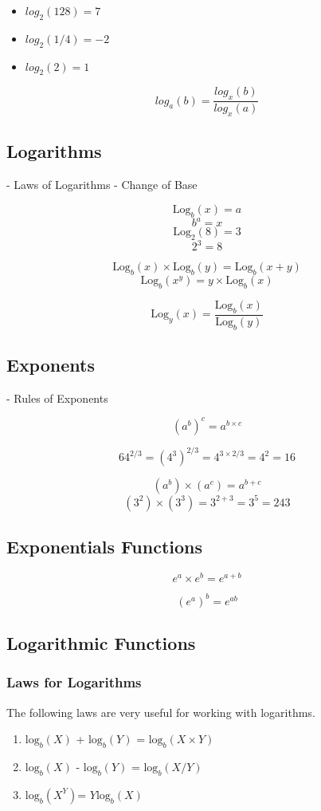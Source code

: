 \documentclass[]{report}
\begin{document}
\begin{itemize}
\item $log_2(128) = 7$
\item $log_2(1/4) = -2$
\item $log_2(2) = 1$
\end{itemize}

\[ log_a(b) = \frac{log_x(b)}{log_x(a)} \]

\subsection{Logarithms} 
- Laws of Logarithms
- Change of Base

\[ \mbox{Log}_b(x) = a \] \[b^a = x \]
\[ \mbox{Log}_2(8) = 3 \] \[2^3 = 8 \]

\[ \mbox{Log}_b(x) \times \mbox{Log}_b(y) =  \mbox{Log}_b(x+y) \]
\[ \mbox{Log}_b(x^y) =  y \times \mbox{Log}_b(x) \]

\[ \mbox{Log}_y(x)  =  \frac{ \mbox{Log}_b(x) }{ \mbox{Log}_b(y) } \]
\subsection{Exponents}
- Rules of Exponents

\[ (a^b)^c = a^{b \times c}\]

\[ 64^{2/3} =  (4^3)^{2/3} = 4^{3\times2/3} = 4^2 = 16 \]


\[ (a^b) \times (a^c) = a^{b+c}\]
\[ (3^2) \times (3^3) = 3^{2+3} = 3^5  =243 \]

\subsection{Exponentials Functions}

\[ e^a \times e^b = e^{a+b}\]

\[ (e^a )^b = e^{ab}\]
\subsection{Logarithmic Functions}

\subsubsection{Laws for Logarithms}
The following laws are very useful for working with logarithms.
\begin{enumerate}
\item $\mbox{log}_b(X)$ + $\mbox{log}_b(Y)$ = $\mbox{log}_b(X\times Y)$
\item $\mbox{log}_b(X)$ - $\mbox{log}_b(Y)$ = $\mbox{log}_b(X / Y)$
\item $\mbox{log}_b(X^Y)$= $Y \mbox{log}_b(X)$
\end{enumerate}
\end{document}
